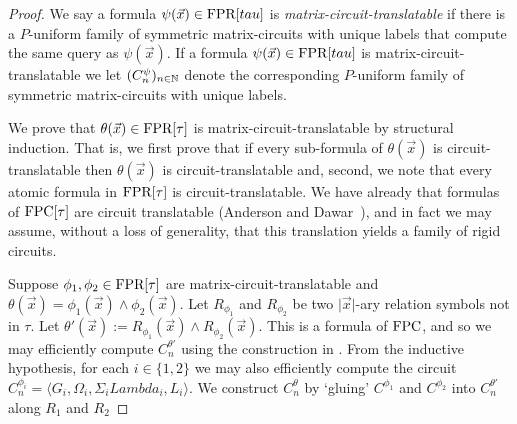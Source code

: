 \documentclass[../paper.tex]{subfiles}
\begin{document}
\begin{proof}
  We say a formula $\psi(\vec{x}) \in \text{\upshape FPR}[tau]$ is
  \emph{matrix-circuit-translatable} if there is a $P$-uniform family of
  symmetric matrix-circuits with unique labels that compute the same query as
  $\psi(\vec{x})$. If a formula $\psi(\vec{x}) \in \text{\upshape FPR}[tau]$ is
  matrix-circuit-translatable we let $(C^\psi_n)_{n \in \mathbb{N}}$ denote the
  corresponding $P$-uniform family of symmetric matrix-circuits with unique
  labels.

  We prove that $\theta(\vec{x}) \in \text{\upshape FPR}[\tau]$ is matrix-circuit-translatable
  by structural induction. That is, we first prove that if every sub-formula of
  $\theta(\vec{x})$ is circuit-translatable then $\theta(\vec{x})$ is
  circuit-translatable and, second, we note that every atomic formula in
  $\text{\upshape FPR}[\tau]$ is circuit-translatable. We have already that formulas of
  $\text{\upshape FPC}[\tau]$ are circuit translatable (Anderson and Dawar~\cite{AndersonD17}),
  and in fact we may assume, without a loss of generality, that this translation
  yields a family of rigid circuits.
  

  Suppose $\phi_1, \phi_2 \in \text{\upshape FPR}[\tau]$ are matrix-circuit-translatable and
  $\theta (\vec{x}) = \phi_1(\vec{x}) \land \phi_2(\vec{x})$. Let $R_{\phi_1}$
  and $R_{\phi_2}$ be two $\vert \vec{x} \vert$-ary relation symbols not in
  $\tau$. Let $\theta' (\vec{x}) := R_{\phi_1}(\vec{x}) \land
  R_{\phi_2}(\vec{x})$. This is a formula of $\text{\upshape FPC}$, and so we may efficiently
  compute $C^{\theta'}_n$ using the construction in \cite{AndersonD17}. From the
  inductive hypothesis, for each $i \in \{1,2\}$ we may also efficiently compute
  the circuit $C^{\phi_i}_n = \langle G_i, \Omega_i, \Sigma_i Lambda_i, L_i
  \rangle$. We construct $C^{\theta}_n$ by `gluing' $C^{\phi_1}$ and
  $C^{\phi_2}$ into $C^{\theta'}_n$ along $R_1$ and $R_2$



\end{proof}
\end{document}

